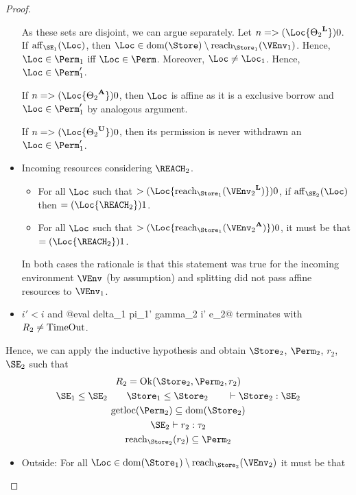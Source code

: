 \begin{proof}
\begin{itemize}
    As these sets are disjoint, we can argue separately.
    Let $n = \MultiNumber\Loc{\Active{\Theta_2}}>0$.
    If $\Affine{\SE_1}\Loc$, then $\Loc \in \Dom{\Store} \setminus
    \Reach{\Store_1}{\VEnv_1}$. Hence, $\Loc\in\Perm_1$ iff
    $\Loc\in\Perm$. Moreover, $\Loc\ne\Loc_1$. Hence,
    $\Loc\in\Perm_1'$.

    If  $n = \MultiNumber\Loc{\MutableBorrows{\Theta_2}}>0$,
    then $\Loc$ is affine as it is a exclusive borrow and
    $\Loc\in\Perm_1'$ by analogous argument.

    If  $n = \MultiNumber\Loc{\ImmutableBorrows{\Theta_2}}>0$,
    then its permission is never withdrawn an $\Loc\in\Perm_1'$.
  \item Incoming resources considering $\REACH_2$.
    \begin{itemize}
    \item
      For all $\Loc$ such that $\MultiNumber\Loc{\Reach{\Store_1}{\Active{\VEnv_2}}} >0$,
      if $\Affine{\SE_2}\Loc$ then $\MultiNumber\Loc{\REACH_2}= 1$.
    \item For all $\Loc$ such that $
      \MultiNumber\Loc{\Reach{\Store_1}{\MutableBorrows{\VEnv_2}}} >0$, it
      must be that $\MultiNumber\Loc{\REACH_2}=1$.
    \end{itemize}
    In both cases the rationale is that this statement was true for
    the incoming environment $\VEnv$ (by assumption) and splitting did
    not pass affine resources to $\VEnv_1$.
  \item $i'<i$ and  @eval delta_1 pi_1' gamma_2 i' e_2@ terminates
    with $R_2 \ne \operatorname{TimeOut}$.
  \end{itemize}
  Hence, we can apply the inductive hypothesis and obtain
  $\Store_2$, $\Perm_2$, $r_2$, $\SE_2$ such that
  \begin{gather}
    \label{eq:6}
    R_2 = \Ok{\Store_2, \Perm_2, r_2}
    \\\label{eq:7}
    \SE_1 \le \SE_2 \qquad
    \Store_1 \le \Store_2 \qquad
    \vdash \Store_2 :  \SE_2
    \\\label{eq:9}
    \Rawloc{\Perm_2} \subseteq \Dom{\Store_2}
    \\\label{eq:8}
    \SE_2 \vdash r_2 : \tau_2
    \\\label{eq:11}
    \Reach{\Store_2}{r_2} \subseteq \Perm_2
  \end{gather}
  \begin{itemize}
  \item Outside: For all $\Loc \in \Dom{\Store_1} \setminus
    \Reach{\Store_2}{\VEnv_2}$ it must be that

\end{itemize}
\end{proof}
